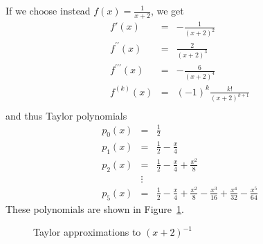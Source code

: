 If we choose instead
$f(x)=\frac{1}{x+2}$, we get
\begin{eqnarray*}
f'(x)&=&-\frac{1}{(x+2)^2}\\
f^{\prime\prime}(x)&=&\frac{2}{(x+2)^3}\\
f^{\prime\prime\prime}(x)&=&-\frac{6}{(x+2)^4}\\
f^{(k)}(x)&=&(-1)^k\frac{k!}{(x+2)^{k+1}}\\
\end{eqnarray*}
and thus Taylor polynomials
\begin{eqnarray*}
p_0(x)&=&\frac{1}{2}\\
p_1(x)&=&\frac{1}{2}-\frac{x}{4}\\
p_2(x)&=&\frac{1}{2}-\frac{x}{4}+\frac{x^2}{8}\\
&\vdots&\\
p_5(x)&=&\frac{1}{2}-\frac{x}{4}+\frac{x^2}{8}-\frac{x^3}{16}+\frac{x^4}{32}-\frac{x^5}{64}
\end{eqnarray*}
These polynomials are shown in Figure~\ref{figtayoneo}.
\begin{figure}
\begin{center}
\end{center}
\caption{Taylor approximations to $(x+2)^{-1}$}
\label{figtayoneo}
\end{figure}


